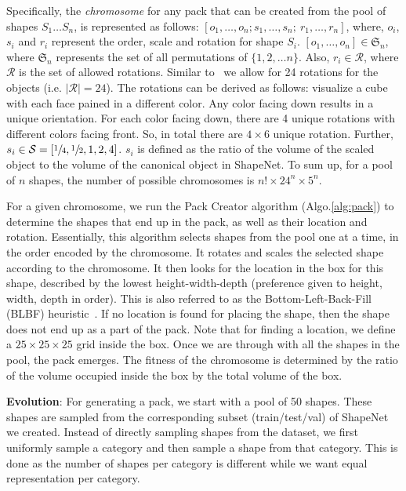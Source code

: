 \documentclass{article}
\begin{document}
Specifically, the \textit{chromosome} for any pack that can be created from the pool of shapes $S_1 \dots S_n$, is represented as follows:
$[o_1, \dots, o_n; s_1, \dots, s_n; \ r_1, \dots, r_n]$, where, $o_i$, $s_i$ and $r_i$ represent the order, scale and rotation for shape $S_i$. $[o_1, \dots , o_n] \in \mathfrak{S}_n$, where $\mathfrak{S}_n$ represents the set of all permutations of $\{1, 2, \dots n\}$. Also, $r_i \in \mathcal{R}$, where $\mathcal{R}$ is the set of allowed rotations. Similar to~\cite{tiwari2010fast} we allow for 24 rotations for the objects (i.e. $|\mathcal{R}| = 24$). The rotations can be derived as follows: visualize a cube with each face pained in a different color. Any color facing down results in a unique orientation. For each color facing down, there are 4 unique rotations with different colors facing front. So, in total there are $4 \times 6$ unique rotation. Further, $s_i \in \mathcal{S} =[\sfrac{1}{4}, \sfrac{1}{2}, 1, 2, 4]$. $s_i$ is defined as the ratio of the volume of the scaled object to the volume of the canonical object in ShapeNet. To sum up, for a pool of $n$ shapes, the number of possible chromosomes is $n! \times 24^n \times 5^n$.

For a given chromosome, we run the Pack Creator algorithm (Algo.\ref{alg:pack}) to determine the shapes that end up in the pack, as well as their location and rotation. Essentially, this algorithm selects shapes from the pool one at a time, in the order encoded by the chromosome. It rotates and scales the selected shape according to the chromosome. It then looks for the location in the box for this shape, described by the lowest height-width-depth (preference given to height, width, depth in order). This is also referred to as the Bottom-Left-Back-Fill (BLBF) heuristic~\cite{tiwari2010fast}. If no location is found for placing the shape, then the shape does not end up as a part of the pack. Note that for finding a location, we define a $25 \times 25 \times 25$ grid inside the box. Once we are through with all the shapes in the pool, the pack emerges. The fitness of the chromosome is determined by the ratio of the volume occupied inside the box by the total volume of the box. 

\noindent \textbf{Evolution}: For generating a pack, we start with a pool of 50 shapes. These shapes are sampled from the corresponding subset (train/test/val) of ShapeNet we created. Instead of directly sampling shapes from the dataset, we first uniformly sample a category and then sample a shape from that category. This is done as the number of shapes per category is different while we want equal representation per category.
\end{document}
